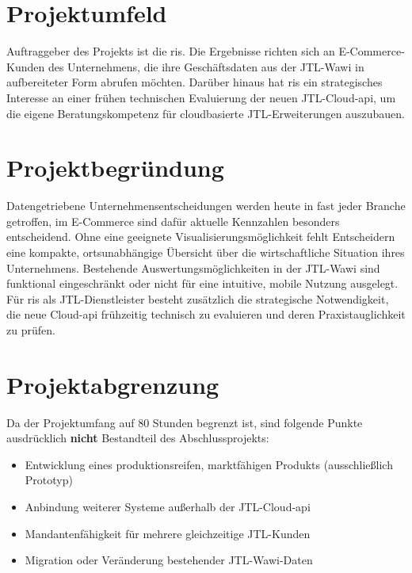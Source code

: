 \documentclass[11pt, a4paper, oneside]{report}
\begin{document}
\section{Projektumfeld}

Auftraggeber des Projekts ist die \gls{ris}. Die Ergebnisse richten sich an E-Commerce-Kunden
des Unternehmens, die ihre Geschäftsdaten aus der JTL-Wawi in aufbereiteter Form abrufen
möchten. Darüber hinaus hat \gls{ris} ein strategisches Interesse an einer frühen technischen
Evaluierung der neuen JTL-Cloud-\gls{api}, um die eigene Beratungskompetenz für
cloudbasierte JTL-Erweiterungen auszubauen.

\section{Projektbegründung}


Datengetriebene Unternehmensentscheidungen werden heute in fast jeder Branche getroffen,
im E-Commerce sind dafür aktuelle Kennzahlen besonders entscheidend.
Ohne eine geeignete Visualisierungsmöglichkeit fehlt Entscheidern
eine kompakte, ortsunabhängige Übersicht über die wirtschaftliche Situation ihres
Unternehmens. Bestehende Auswertungsmöglichkeiten in der JTL-Wawi sind funktional
eingeschränkt oder nicht für eine intuitive, mobile Nutzung ausgelegt.
Für \gls{ris} als JTL-Dienstleister besteht zusätzlich die strategische Notwendigkeit,
die neue Cloud-\gls{api} frühzeitig technisch zu evaluieren und deren Praxistauglichkeit
zu prüfen.

\section{Projektabgrenzung}

Da der Projektumfang auf 80 Stunden begrenzt ist, sind folgende Punkte ausdrücklich
\textbf{nicht} Bestandteil des Abschlussprojekts:

\begin{itemize}[leftmargin=1.5em]
  \item Entwicklung eines produktionsreifen, marktfähigen Produkts (ausschließlich Prototyp)
  \item Anbindung weiterer Systeme außerhalb der JTL-Cloud-\gls{api}
  \item Mandantenfähigkeit für mehrere gleichzeitige JTL-Kunden
  \item Migration oder Veränderung bestehender JTL-Wawi-Daten
\end{itemize}
\end{document}
